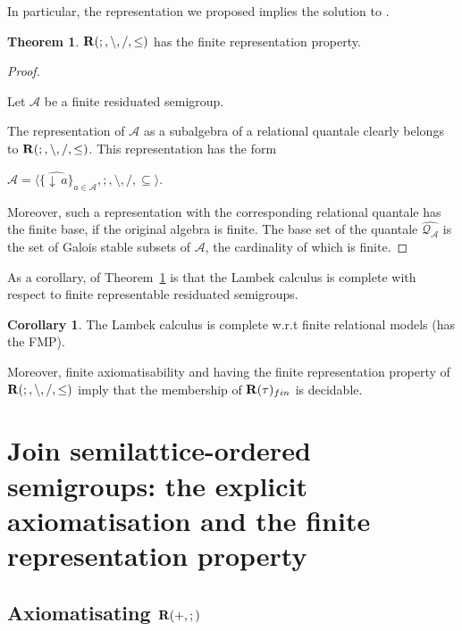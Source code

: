 \documentclass[a4paper]{article}
\theoremstyle{definition}
\theoremstyle{theorem}
\newtheorem{theorem}{Theorem}
\theoremstyle{proposition}
\theoremstyle{lemma}
\theoremstyle{ex}
\theoremstyle{corollary}
\newtheorem{corollary}{Corollary}
\theoremstyle{claim}
\newcommand{\down}[1]{\ensuremath{{\downarrow}\,#1}}
\begin{document}
In particular, the representation we proposed implies the solution to \cite[Problem 19.17]{hirsch2002relation}.
\begin{theorem} \label{solution}
  ${\bf R}(;, \setminus, /, \leq)$ has the finite representation property.
\end{theorem}

\begin{proof}
  $ $

  Let $\mathcal{A}$ be a finite residuated semigroup.

  The representation of $\mathcal{A}$ as a subalgebra of a relational quantale clearly belongs to ${\bf R}(;, \setminus, /, \leq)$. This representation has the form

\begin{center}
  $\widehat{\mathcal{A}} = \langle \{ \widehat{\down{a}} \}_{a \in \mathcal{A}}, ;, \setminus, /, \subseteq \rangle$.
\end{center}

  Moreover, such a representation with the corresponding relational quantale has the finite base, if the original algebra is finite. The base set of the quantale $\widehat{\mathcal{Q}_{\mathcal{A}}}$ is the set of Galois stable subsets of $\mathcal{A}$, the cardinality of which is finite.
\end{proof}

As a corollary, of Theorem~\ref{solution} is that the Lambek calculus is complete with respect to finite representable residuated semigroups.

\begin{corollary} \label{fmp}
  The Lambek calculus is complete w.r.t finite relational models (has the FMP).
\end{corollary}

Moreover, finite axiomatisability and having the finite representation property of ${\bf R}(;, \setminus, /, \leq)$ imply that the membership of ${\bf R}(\tau)_{fin}$ is decidable.

\section{Join semilattice-ordered semigroups: the explicit axiomatisation and the finite representation property}

\subsection{Axiomatisating ${\bf R}(+, ;)$}
\end{document}
